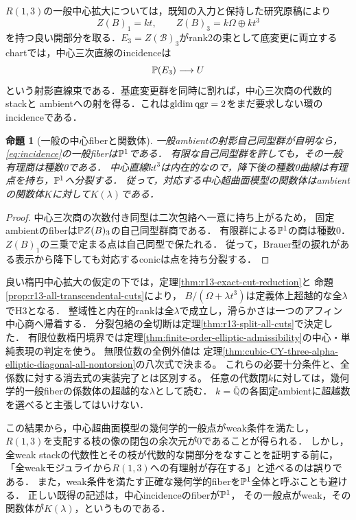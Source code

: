 \documentclass[11pt,a4paper]{ltjsarticle}
\newtheorem{proposition}[theorem]{命題}
\theoremstyle{definition}\newtheorem{definition}[theorem]{定義}
\newcommand{\qgr}{\operatorname{qgr}}\newcommand{\Gr}{\operatorname{Gr}}
\begin{document}
$R(1,3)$の一般中心拡大については，既知の入力と保持した研究原稿により
\[
 Z(B)_1=kt,\qquad Z(B)_3=k\Omega\oplus kt^3
\]
を持つ良い開部分を取る．$E_3=Z(\mathcal B)_3$がrank2の束として底変更に両立する
chartでは，中心三次直線のincidenceは
\begin{equation}\label{eq:incidence}
 \mathbb P(E_3)\longrightarrow U
\end{equation}
という射影直線束である．基底変更群を同時に割れば，中心三次商の代数的stackと
ambientへの射を得る．これは$\gldim\qgr=2$をまだ要求しない環のincidenceである．

\begin{proposition}[一般の中心fiberと関数体]\label{prop:generic-fiber}
一般ambientの射影自己同型群が自明なら，\eqref{eq:incidence}の一般fiberは$\mathbb P^1$である．
有限な自己同型群を許しても，その一般有理商は種数0である．
中心直線$kt^3$は内在的なので，降下後の種数0曲線は有理点を持ち，$\mathbb P^1$へ分裂する．
従って，対応する中心超曲面模型の関数体はambientの関数体$K$に対して$K(\lambda)$である．
\end{proposition}
\begin{proof}
中心三次商の次数付き同型は二次包絡へ一意に持ち上がるため，
固定ambientのfiberは$\mathbb P Z(B)_3$の自己同型群商である．
有限群による$\mathbb P^1$の商は種数0．$Z(B)_1$の三乗で定まる点は自己同型で保たれる．
従って，Brauer型の捩れがある表示から降下しても対応するconicは点を持ち分裂する．
\end{proof}

良い楕円中心拡大の仮定の下では，定理\ref{thm:r13-exact-cut-reduction}と
命題\ref{prop:r13-all-transcendental-cuts}により，
$B/(\Omega+\lambda t^3)$は定義体上超越的な全$\lambda$でH3となる．
整域性と内在的rankは全$\lambda$で成立し，滑らかさは一つのアフィン中心商へ帰着する．
分裂包絡の全切断は定理\ref{thm:r13-split-all-cuts}で決定した．
有限位数楕円境界では定理\ref{thm:finite-order-elliptic-admissibility}の中心・単純表現の判定を使う。
無限位数の全例外値は
定理\ref{thm:cubic-CY-three-alpha-elliptic-diagonal-all-nontorsion}の八次式で決まる。
これらの必要十分条件と、全係数に対する消去式の実装完了とは区別する。
任意の代数閉$k$に対しては，幾何学的一般fiberの係数体の超越的な$\lambda$として読む．
$k=\overline{\mathbb Q}$の各固定ambientに超越数を選べると主張してはいけない．

この結果から，中心超曲面模型の幾何学的一般点がweak条件を満たし，
$R(1,3)$を支配する枝の像の閉包の余次元が0であることが得られる．
しかし，全weak stackの代数性とその枝が代数的な開部分をなすことを証明する前に，
「全weakモジュライから$R(1,3)$への有理射が存在する」と述べるのは誤りである．
また，weak条件を満たす正確な幾何学的fiberを$\mathbb P^1$全体と呼ぶことも避ける．
正しい既得の記述は，中心incidenceのfiberが$\mathbb P^1$，
その一般点がweak，その関数体が$K(\lambda)$，というものである．
\end{document}
